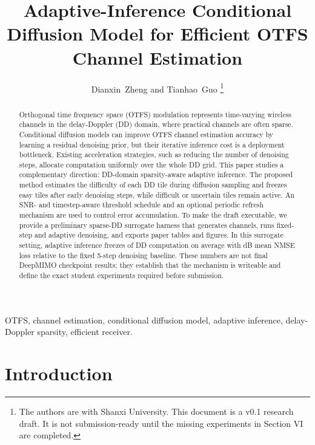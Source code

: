 \documentclass[10pt,journal]{IEEEtran}
\begin{document}
\title{Adaptive-Inference Conditional Diffusion Model for Efficient OTFS Channel Estimation}

\author{Dianxin~Zheng and Tianhao~Guo%
\thanks{The authors are with Shanxi University. This document is a v0.1
research draft. It is not submission-ready until the missing experiments in
Section VI are completed.}}

\maketitle

\begin{abstract}
Orthogonal time frequency space (OTFS) modulation represents time-varying
wireless channels in the delay-Doppler (DD) domain, where practical channels
are often sparse. Conditional diffusion models can improve OTFS channel
estimation accuracy by learning a residual denoising prior, but their iterative
inference cost is a deployment bottleneck. Existing acceleration strategies,
such as reducing the number of denoising steps, allocate computation uniformly
over the whole DD grid. This paper studies a complementary direction:
DD-domain sparsity-aware adaptive inference. The proposed method estimates the
difficulty of each DD tile during diffusion sampling and freezes easy tiles
after early denoising steps, while difficult or uncertain tiles remain active.
An SNR- and timestep-aware threshold schedule and an optional periodic refresh
mechanism are used to control error accumulation. To make the draft executable,
we provide a preliminary sparse-DD surrogate harness that generates channels,
runs fixed-step and adaptive denoising, and exports paper tables and figures.
In this surrogate setting, adaptive inference freezes \PrelimMeanInactive{} of
DD computation on average with \PrelimMeanLoss{} dB mean NMSE loss relative to
the fixed 5-step denoising baseline. These numbers are not final DeepMIMO
checkpoint results; they establish that the mechanism is writeable and define
the exact student experiments required before submission.
\end{abstract}

\begin{IEEEkeywords}
OTFS, channel estimation, conditional diffusion model, adaptive inference,
delay-Doppler sparsity, efficient receiver.
\end{IEEEkeywords}

\section{Introduction}
\end{document}
